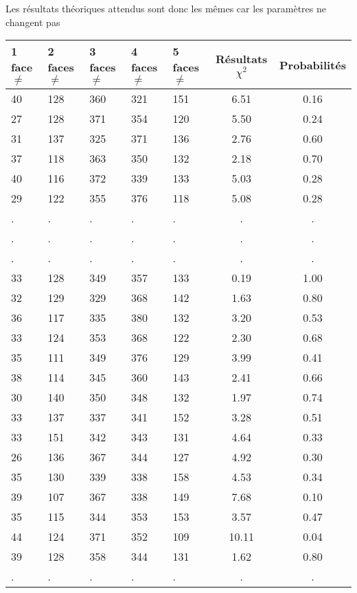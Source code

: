\documentclass[12pt,a4paper]{article}
\begin{document}
Les résultats théoriques attendus sont donc les mêmes car les paramètres ne changent pas
\begin{center}
\begin{tabular}{|l|l|l|l|l|c|c|}
\hline
1 face $\neq$ & 2 faces $\neq$  & 3 faces $\neq$ & 4 faces $\neq$ & 5 faces $\neq$ & Résultats $\chi^2$ & Probabilités \\
\hline \hline
40 & 128 & 360 & 321 & 151 &  6.51 &  0.16\\ \hline
27 & 128 & 371 & 354 & 120 &  5.50 &  0.24\\ \hline
31 & 137 & 325 & 371 & 136 &  2.76 &  0.60\\ \hline
37 & 118 & 363 & 350 & 132 &  2.18 &  0.70\\ \hline
40 & 116 & 372 & 339 & 133 &  5.03 &  0.28\\ \hline
29 & 122 & 355 & 376 & 118 &  5.08 &  0.28\\ \hline
 . & . & . & . & . & . & . \\ \hline
 . & . & . & . & . & . & . \\ \hline
 . & . & . & . & . & . & . \\ \hline
33 & 128 & 349 & 357 & 133 &  0.19 &  1.00\\ \hline
32 & 129 & 329 & 368 & 142 &  1.63 &  0.80\\ \hline
36 & 117 & 335 & 380 & 132 &  3.20 &  0.53\\ \hline
33 & 124 & 353 & 368 & 122 &  2.30 &  0.68\\ \hline
35 & 111 & 349 & 376 & 129 &  3.99 &  0.41\\ \hline
38 & 114 & 345 & 360 & 143 &  2.41 &  0.66\\ \hline
30 & 140 & 350 & 348 & 132 &  1.97 &  0.74\\ \hline
33 & 137 & 337 & 341 & 152 &  3.28 &  0.51\\ \hline
33 & 151 & 342 & 343 & 131 &  4.64 &  0.33\\ \hline
26 & 136 & 367 & 344 & 127 &  4.92 &  0.30\\ \hline
35 & 130 & 339 & 338 & 158 &  4.53 &  0.34\\ \hline
39 & 107 & 367 & 338 & 149 &  7.68 &  0.10\\ \hline
35 & 115 & 344 & 353 & 153 &  3.57 &  0.47\\ \hline
44 & 124 & 371 & 352 & 109 & 10.11 &  0.04\\ \hline
39 & 128 & 358 & 344 & 131 &  1.62 &  0.80\\ \hline
 . & . & . & . & . & . & . \\ \hline

\end{tabular}
\end{center}
\end{document}
